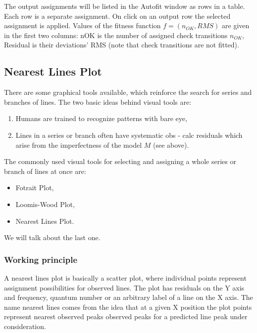 \documentclass[11pt]{article}
\begin{document}
The output assignments will be listed in the Autofit window as rows in a table. Each row is a separate assignment. On click on an output row the selected assignment is applied. Values of the fitness function $f = (n_{OK}, {RMS})$ are given in the first two columns: nOK is the number of assigned check transitions $n_{OK}$, Residual is their deviations' RMS (note that check transitions are not fitted).


\subsection{Nearest Lines Plot}

There are some graphical tools available, which reinforce the search for series and branches of lines. The two basic ideas behind visual tools are:
\begin{enumerate}
    \item Humans are trained to recognize patterns with bare eye,
    \item Lines in a series or branch often have systematic obs - calc residuals which arise from the imperfectness of the model $M$ (see above). 
\end{enumerate}

The commonly used visual tools for selecting and assigning a whole series or branch of lines at once are:
\begin{itemize}
    \item Fotrait Plot,
    \item Loomis-Wood Plot,
    \item Nearest Lines Plot.
\end{itemize}

We will talk about the last one. 

\subsubsection{Working principle}

A nearest lines plot is basically a scatter plot, where individual points represent assignment possibilities for observed lines. The plot has residuals on the Y axis and frequency, quantum number or an arbitrary label of a line on the X axis. The name nearest lines comes from the idea that at a given X position the plot points represent nearest observed peaks observed peaks for a predicted line peak under consideration. 
\end{document}
